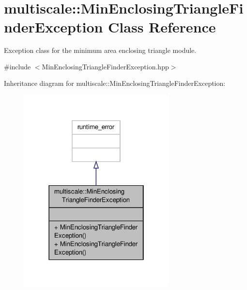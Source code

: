 \hypertarget{classmultiscale_1_1MinEnclosingTriangleFinderException}{\section{multiscale\-:\-:Min\-Enclosing\-Triangle\-Finder\-Exception Class Reference}
\label{classmultiscale_1_1MinEnclosingTriangleFinderException}
}


Exception class for the minimum area enclosing triangle module.  




{\ttfamily \#include $<$Min\-Enclosing\-Triangle\-Finder\-Exception.\-hpp$>$}



Inheritance diagram for multiscale\-:\-:Min\-Enclosing\-Triangle\-Finder\-Exception\-:\nopagebreak
\begin{figure}[H]
\begin{center}
\leavevmode
\includegraphics[width=226pt]{classmultiscale_1_1MinEnclosingTriangleFinderException__inherit__graph}
\end{center}
\end{figure}


